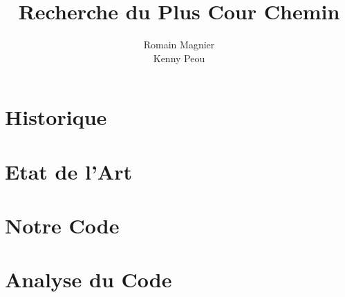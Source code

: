 \documentclass[12pt]{article}
\title{Recherche du Plus Cour Chemin}
\author{Romain Magnier\\Kenny Peou}
\begin{document}
\maketitle

\section*{Historique}



\section*{Etat de l'Art}



\section*{Notre Code}



\section*{Analyse du Code}
\end{document}
